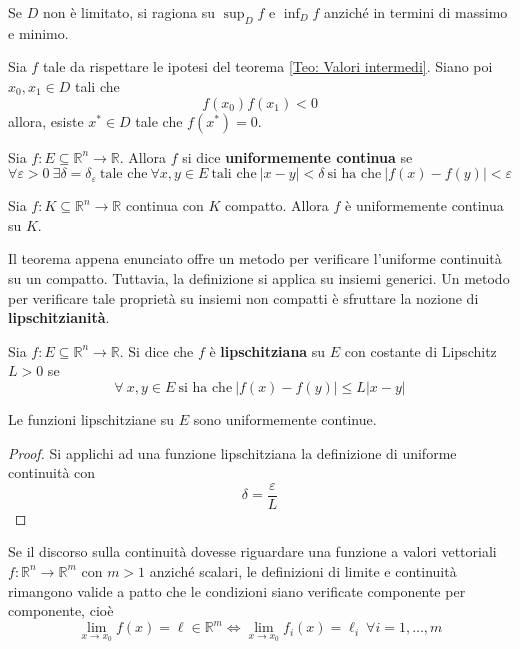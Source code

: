     \begin{oss}
        Se $D$ non è limitato, si ragiona su $\sup_{D}{f}$ e $\inf_{D}{f}$ anziché in termini di massimo e minimo.
    \end{oss}
\begin{corollary} \label{Teo: Teorema degli zeri}
    Sia $f$ tale da rispettare le ipotesi del teorema \ref{Teo: Valori intermedi}. Siano poi $x_0, x_1 \in D$ tali che 
    \begin{equation}
        f(x_0)f(x_1) < 0
    \end{equation}
    allora, esiste $x^* \in D$ tale che $f(x^*)=0$.
\end{corollary}
\begin{definition} \label{Def: Uniforme continuità}
    Sia $f:E \subseteq \mathbb{R}^n \to \mathbb{R}$. Allora $f$ si dice \textbf{uniformemente continua} se
    \begin{equation}
        \forall \varepsilon >0 \ \exists \delta=\delta_\varepsilon\ \text{tale che}\ \forall x, y \in E\ \text{tali che}\ |x-y|<\delta\ \text{si ha che}\ |f(x)-f(y)| < \varepsilon
    \end{equation}
\end{definition}
\begin{theorem} \label{Teo: Heine Cantor}
    Sia $f: K \subseteq \mathbb{R}^n \to \mathbb{R}$ continua con $K$ compatto. Allora $f$ è uniformemente continua su $K$.
\end{theorem}
Il teorema appena enunciato offre un metodo per verificare l'uniforme continuità su un compatto. Tuttavia, la definizione si applica su insiemi generici. Un metodo per verificare tale proprietà su insiemi non compatti è sfruttare la nozione di \textbf{lipschitzianità}.
\begin{definition} \label{Def: Funzione lipschitziana}
    Sia $f:E \subseteq \mathbb{R}^n \to \mathbb{R}$. Si dice che $f$ è \textbf{lipschitziana} su $E$ con costante di Lipschitz $L>0$ se
    \begin{equation}
        \forall\ x,y \in E\ \text{si ha che}\ |f(x)-f(y)| \leq L|x-y|
    \end{equation}
\end{definition}
\begin{proposition}
    Le funzioni lipschitziane su $E$ sono uniformemente continue.
\end{proposition}
    \begin{proof}
        Si applichi ad una funzione lipschitziana la definizione di uniforme continuità con 
        \begin{equation}
            \delta= \frac{\varepsilon}{L}
        \end{equation}
    \end{proof}
Se il discorso sulla continuità dovesse riguardare una funzione a valori vettoriali $f: \mathbb{R}^n \to \mathbb{R}^m$ con $m>1$ anziché scalari, le definizioni di limite e continuità rimangono valide a patto che le condizioni siano verificate componente per componente, cioè
\begin{equation}
    \lim_{x \to x_0}{f(x)}=\ell \in \mathbb{R}^m \iff \lim_{x \to x_0}{f_i(x)}=\ell_i\ \forall i=1, \dots, m
\end{equation}
